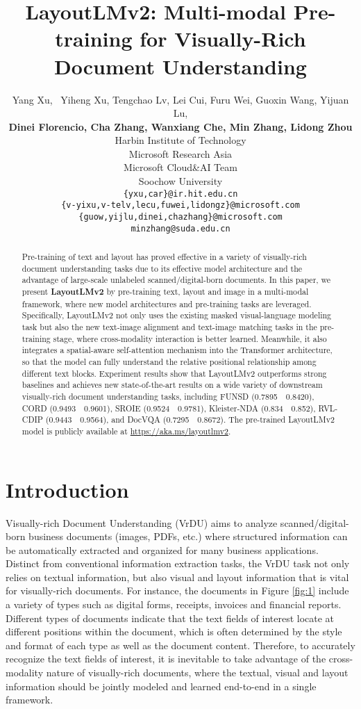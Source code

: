 \documentclass{article} \usepackage{iclr2021_conference,times}
\title{LayoutLMv2: Multi-modal Pre-training for Visually-Rich Document Understanding}
\author{Yang Xu,~ Yiheng Xu, Tengchao Lv, Lei Cui, Furu Wei, Guoxin Wang, Yijuan Lu, \\ \textbf{Dinei Florencio, Cha Zhang, Wanxiang Che, Min Zhang, Lidong Zhou} \\
Harbin Institute of Technology\\
Microsoft Research Asia\\
Microsoft Cloud\&AI Team\\
Soochow University\\
\texttt{\{yxu,car\}@ir.hit.edu.cn}\\
\texttt{\{v-yixu,v-telv,lecu,fuwei,lidongz\}@microsoft.com} \\
\texttt{\{guow,yijlu,dinei,chazhang\}@microsoft.com}\\
\texttt{minzhang@suda.edu.cn}
}
\begin{document}
\maketitle

\begin{abstract}

Pre-training of text and layout has proved effective in a variety of visually-rich document understanding tasks due to its effective model architecture and the advantage of large-scale unlabeled scanned/digital-born documents. In this paper, we present \textbf{LayoutLMv2} by pre-training text, layout and image in a multi-modal framework, where new model architectures and pre-training tasks are leveraged. Specifically, LayoutLMv2 not only uses the existing masked visual-language modeling task but also the new text-image alignment and text-image matching tasks in the pre-training stage, where cross-modality interaction is better learned. Meanwhile, it also integrates a spatial-aware self-attention mechanism into the Transformer architecture, so that the model can fully understand the relative positional relationship among different text blocks.
Experiment results show that LayoutLMv2 outperforms strong baselines and achieves new state-of-the-art results on a wide variety of downstream visually-rich document understanding tasks, including FUNSD (0.7895~~0.8420), CORD (0.9493~~0.9601), SROIE (0.9524~~0.9781), Kleister-NDA (0.834~~0.852), RVL-CDIP (0.9443~~0.9564), and DocVQA (0.7295~~0.8672). The pre-trained LayoutLMv2 model is publicly available at \url{https://aka.ms/layoutlmv2}.

\end{abstract}

\section{Introduction}

Visually-rich Document Understanding (VrDU) aims to analyze scanned/digital-born business documents (images, PDFs, etc.) where structured information can be automatically extracted and organized for many business applications. Distinct from conventional information extraction tasks, the VrDU task not only relies on textual information, but also visual and layout information that is vital for visually-rich documents. For instance, the documents in Figure \ref{fig:1} include a variety of types such as digital forms, receipts, invoices and financial reports. Different types of documents indicate that the text fields of interest locate at different positions within the document, which is often determined by the style and format of each type as well as the document content. Therefore, to accurately recognize the text fields of interest, it is inevitable to take advantage of the cross-modality nature of visually-rich documents, where the textual, visual and layout information should be jointly modeled and learned end-to-end in a single framework.
\end{document}
